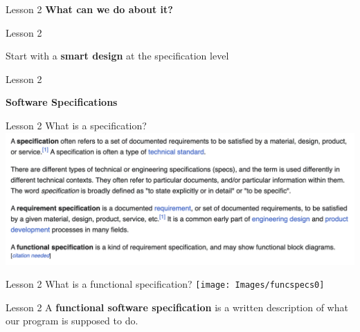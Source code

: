 \documentclass[aspectratio=1610]{beamer}
\begin{document}
\begin{frame}
\end{frame}

\begin{frame}
\end{frame}

\begin{frame}
\end{frame}

\begin{frame}{Lesson 2}{}
\Huge
\center
    \textbf{What can we do about it?} 
\end{frame}



\begin{frame}{Lesson 2}{}
\Huge
\begin{center}
   Start with a \textbf{smart design} at the specification level
\end{center}
\end{frame}


\begin{frame}{Lesson 2}{}
\begin{center}
\Huge\textbf{Software Specifications}
\end{center}
\end{frame}


\begin{frame}{Lesson 2}{}
\Huge{What is a specification?}
\includegraphics[scale=0.52]{Images/specs}
\end{frame}


\begin{frame}{Lesson 2}{}
\Huge{What is a functional specification?}
\texttt{[image: Images/funcspecs0]}
\end{frame}


\begin{frame}{Lesson 2}{}
\huge
    A \textbf{functional software specification} is a
    \alert{written} description of what our program is supposed to do.
\end{frame}
\end{document}
